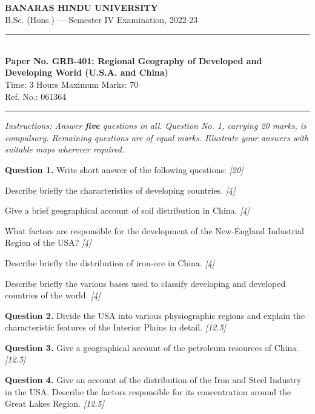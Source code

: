 \documentclass[11pt,a4paper]{article}
\newcommand{\pts}[1]{\hfill   \textit{[#1]}}
\begin{document}
\begin{center}
  {\large\bfseries BANARAS HINDU UNIVERSITY}\\[2pt]
  {\normalsize B.Sc. (Hons.) --- Semester IV Examination, 2022-23}\\[6pt]
  \rule{0.8\linewidth}{0.5pt}\\[6pt]
  {\large\bfseries Paper No. GRB-401: Regional Geography of Developed and Developing World (U.S.A. and China)}\\[4pt]
  {\normalsize Time: 3 Hours \hfill Maximum Marks: 70}\\[2pt]
  {\small Ref. No.: 061364}
\end{center}
\rule{\linewidth}{0.4pt}
\smallskip



\noindent   \textit{Instructions: Answer   \textbf{five} questions in all. Question No. 1, carrying 20 marks, is compulsory. Remaining questions are of equal marks. Illustrate your answers with suitable maps wherever required.}
\bigskip




\noindent   \textbf{Question 1.} Write short answer of the following questions: \pts{20}

\begin{parts}
  \item Describe briefly the characteristics of developing countries. \pts{4}
  \item Give a brief geographical account of soil distribution in China. \pts{4}
  \item What factors are responsible for the development of the New-England Industrial Region of the USA? \pts{4}
  \item Describe briefly the distribution of iron-ore in China. \pts{4}
  \item Describe briefly the various bases used to classify developing and developed countries of the world. \pts{4}
\end{parts}

\medskip


\noindent   \textbf{Question 2.} Divide the USA into various physiographic regions and explain the characteristic features of the Interior Plains in detail. \pts{12.5}

\medskip


\noindent   \textbf{Question 3.} Give a geographical account of the petroleum resources of China. \pts{12.5}

\medskip


\noindent   \textbf{Question 4.} Give an account of the distribution of the Iron and Steel Industry in the USA. Describe the factors responsible for its concentration around the Great Lakes Region. \pts{12.5}
\end{document}
